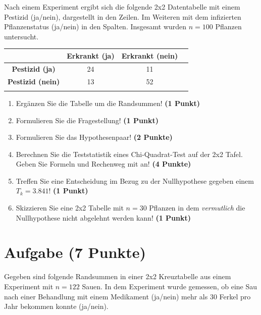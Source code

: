 \documentclass[a4paper, 10pt]{scrartcl}\usepackage[]{graphicx}\usepackage[]{xcolor}
\begin{document}
Nach einem Experiment ergibt sich die folgende 2x2 Datentabelle mit einem
Pestizid (ja/nein), dargestellt in den Zeilen. Im Weiteren mit dem
infizierten Pflanzenstatus (ja/nein) in den Spalten. Insgesamt wurden
$n = 100$ Pflanzen untersucht.
\vspace{5Ex}

\begin{center}
  \Large
  \begin{tabular}{c|c|c|c}
     & \textbf{Erkrankt (ja)} & \textbf{Erkrankt (nein)} &  \strut\\
    \hline
    \textbf{Pestizid (ja)} & 24  & 11  &     \strut\\
    \hline
    \textbf{Pestizid (nein)} & 13  & 52  &      \strut\\
    \hline
     \phantom{100} & \phantom{100}  & \phantom{100}  &  \phantom{100}  \strut\\
  \end{tabular}
\end{center}

\vspace{5Ex}

\begin{enumerate}
\item Erg{\"a}nzen Sie die Tabelle um die Randsummen! \textbf{(1 Punkt)} 
\item Formulieren Sie die Fragestellung! \textbf{(1 Punkt)}
\item Formulieren Sie das Hypothesenpaar! \textbf{(2 Punkte)}
\item Berechnen Sie die Teststatistik eines Chi-Quadrat-Test auf der 2x2
  Tafel. Geben Sie Formeln und Rechenweg mit an! \textbf{(4 Punkte)}
\item Treffen Sie eine Entscheidung im Bezug zu der Nullhypothese gegeben
  einem $T_k = 3.841$! \textbf{(1 Punkt)}
\item Skizzieren Sie eine 2x2 Tabelle mit
  $n = 30$ Pflanzen in dem \textit{vermutlich}
  die Nullhypothese nicht abgelehnt werden kann! \textbf{(1 Punkt)}
\end{enumerate} 
\clearpage

\section{Aufgabe \hfill (7 Punkte)}



Gegeben sind folgende Randsummen in einer 2x2 Kreuztabelle aus einem
Experiment mit $n = 122$ Sauen. In dem Experiment wurde gemessen,
ob eine Sau nach einer Behandlung mit einem Medikament (ja/nein)
mehr als 30 Ferkel pro Jahr bekommen konnte (ja/nein).
\end{document}
